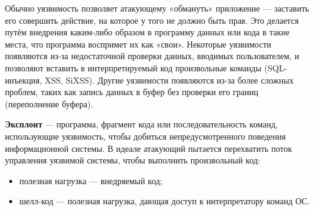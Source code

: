 Обычно уязвимость позволяет атакующему «обмануть» приложение — заставить его совершить действие, на которое у того не должно быть прав. Это делается путём внедрения каким-либо образом в программу данных или кода в такие места, что программа воспримет их как «свои». Некоторые уязвимости появляются из-за недостаточной проверки данных, вводимых пользователем, и позволяют вставить в интерпретируемый код произвольные команды (SQL-инъекция, XSS, SiXSS). Другие уязвимости появляются из-за более сложных проблем, таких как запись данных в буфер без проверки его границ (переполнение буфера).

\textbf{Эксплоит} — программа, фрагмент кода или последовательность команд, использующие уязвимость, чтобы добиться непредусмотренного поведения информационной системы.
В идеале атакующий пытается перехватить поток управления уязвимой системы, чтобы выполнить произвольный код:
\begin{itemize}
    \item полезная нагрузка — внедряемый код;
    \item шелл-код — полезная нагрузка, дающая доступ к интерпретатору команд ОС.
\end{itemize}